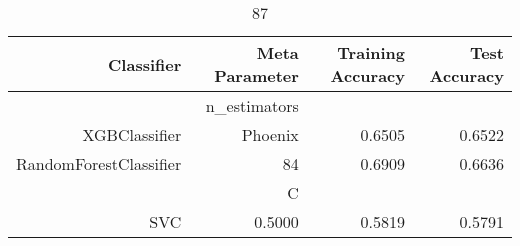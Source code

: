
\begin{table}[H]
    \caption{87}
    \centering
    \begin{tabular}{|r|r|r|r|}
        \hline
        Classifier &Meta Parameter &Training Accuracy
        &Test Accuracy\\
        \hline
        &n\_estimators &\multicolumn{2}{|r|}{}\\
        \hline
        XGBClassifier &Phoenix &0.6505 &0.6522\\
        \hline
        RandomForestClassifier &84 &0.6909 &0.6636\\
        \hline
        &C &\multicolumn{2}{|r|}{}\\
        \hline
        SVC &0.5000 &0.5819 &0.5791\\
        \hline
    \end{tabular}
\end{table}
